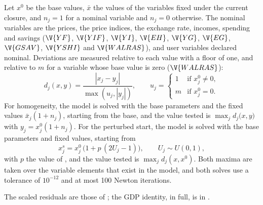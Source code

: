 Let $x^0$ be the base values, $\bar x$ the values of the variables fixed under
the current closure, and $n_j = 1$ for a nominal variable and $n_j = 0$
otherwise. The nominal variables are the prices, the price indices, the
exchange rate, incomes, spending and savings ($\V{YF}$, $\V{YIF}$, $\V{YI}$,
$\V{EH}$, $\V{YG}$, $\V{EG}$, $\V{GSAV}$, $\V{YSHI}$ and $\V{WALRAS}$), and
user variables declared nominal. Deviations are measured relative to each value with a floor of one,
and relative to $m$ for a variable whose base value is zero ($\V{WALRAS}$):
\begin{equation*}
d_j(x, y) = \frac{|x_j - y_j|}{\max(u_j, |y_j|)}, \qquad
u_j = \begin{cases} 1 & \text{if } x^0_j \neq 0,\\ m & \text{if } x^0_j = 0 . \end{cases}
\end{equation*}
For homogeneity, the model is solved with the base parameters and the fixed
values $\bar x_j (1 + n_j)$, starting from the base, and the value tested is
$\max_j d_j\bigl(x, y\bigr)$ with $y_j = x^0_j (1 + n_j)$. For the perturbed
start, the model is solved with the base parameters and fixed values, starting
from
\begin{equation*}
x^s_j = x^0_j\,\bigl(1 + p\,(2 U_j - 1)\bigr), \qquad U_j \sim U(0, 1),
\end{equation*}
with $p$ the value of , and the value tested is
$\max_j d_j(x, x^0)$. Both maxima are taken over the variable elements that
exist in the model, and both solves use a tolerance of $10^{-12}$ and at most
100 Newton iterations.

The scaled residuals are those of ; the GDP identity, in
full, is in .


\begin{alsosee}
\end{alsosee}
